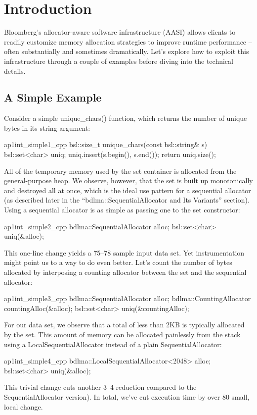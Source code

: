 \section{Introduction}

Bloomberg’s allocator-aware software infrastructure (AASI) allows clients to
readily customize memory allocation strategies to improve runtime
performance – often substantially and sometimes dramatically. Let’s explore
how to exploit this infrastructure through a couple of examples before diving
into the technical details.

\subsection{A Simple Example}

Consider a simple unique_chars() function, which returns the number of
unique bytes in its string argument:
\begin{cppcodeblock}{ap1int_simple1_cpp}
    bsl::size_t unique_chars(const bsl::string& s)
    {
         bsl::set<char> uniq;
         uniq.insert(s.begin(), s.end());
         return uniq.size();
    }
\end{cppcodeblock}
All of the temporary memory used by the set container is allocated from the
general-purpose heap. We observe, however, that the set is built up
monotonically and destroyed all at once, which is the ideal use pattern for a
sequential allocator (as described later in the “bdlma::SequentialAllocator
and Its Variants” section). Using a sequential allocator is as simple as passing
one to the set constructor:
\begin{cppcodeblock}{ap1int_simple2_cpp}
    bdlma::SequentialAllocator alloc;
    bsl::set<char> uniq(&alloc);
\end{cppcodeblock}
This one-line change yields a 75–78%
sample input data set. Yet instrumentation might point us to a way to do even
better. Let’s count the number of bytes allocated by interposing a counting
allocator between the set and the sequential allocator:
\begin{cppcodeblock}{ap1int_simple3_cpp}
    bdlma::SequentialAllocator alloc;
    bdlma::CountingAllocator countingAlloc(&alloc);
    bsl::set<char> uniq(&countingAlloc);
\end{cppcodeblock}
For our data set, we observe that a total of less than 2KB is typically allocated
by the set. This amount of memory can be allocated painlessly from the stack
using a LocalSequentialAllocator instead of a plain SequentialAllocator:
\begin{cppcodeblock}{ap1int_simple4_cpp}
    bdlma::LocalSequentialAllocator<2048> alloc;
    bsl::set<char> uniq(&alloc);
\end{cppcodeblock}
This trivial change cuts another 3–4%
reduction compared to the SequentialAllocator version). In total, we’ve cut
execution time by over 80%
small, local change.


